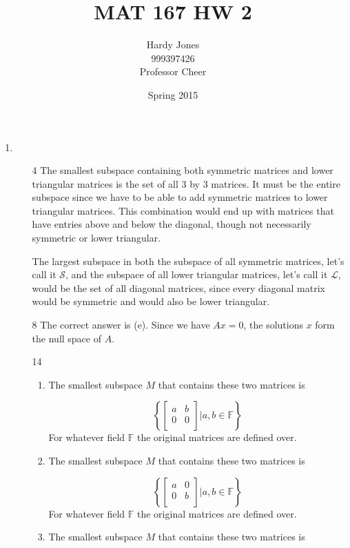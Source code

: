 \documentclass[12pt,letterpaper]{article}
\title{MAT 167 HW 2\vspace{-2ex}}
\author{Hardy Jones\\
        999397426\\
        Professor Cheer\vspace{-2ex}}
\date{Spring 2015}
\begin{document}
  \maketitle

  \begin{enumerate}[label=\S 2.\arabic*]
    \item
      \begin{enumerate}
        \item [4]
          The smallest subspace containing both symmetric matrices and lower triangular matrices is the set of all 3 by 3 matrices.
          It must be the entire subspace since we have to be able to add symmetric matrices to lower triangular matrices. This combination would end up with matrices that have entries above and below the diagonal, though not necessarily symmetric or lower triangular.

          The largest subspace in both the subspace of all symmetric matrices, let's call it $\mathcal{S}$, and the subspace of all lower triangular matrices, let's call it $\mathcal{L}$, would be the set of all diagonal matrices, since every diagonal matrix would be symmetric and would also be lower triangular.

        \item [8]
          The correct answer is (e).
          Since we have $Ax = 0$, the solutions $x$ form the null space of $A$.
        \item [14]
          \begin{enumerate}
            \item
              The smallest subspace $M$ that contains these two matrices is

              \[
                \left\{
                  \begin{bmatrix}
                    a & b \\
                    0 & 0 \\
                  \end{bmatrix}
                  |
                  a, b \in \mathbb{F}
                \right\}
              \]
              For whatever field $\mathbb{F}$ the original matrices are defined over.
            \item
              The smallest subspace $M$ that contains these two matrices is

              \[
                \left\{
                  \begin{bmatrix}
                    a & 0 \\
                    0 & b \\
                  \end{bmatrix}
                  |
                  a, b \in \mathbb{F}
                \right\}
              \]
              For whatever field $\mathbb{F}$ the original matrices are defined over.
            \item
              The smallest subspace $M$ that contains these two matrices is


\end{enumerate}
\end{enumerate}
\end{enumerate}
\end{document}
